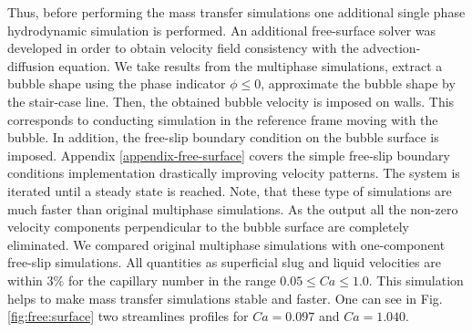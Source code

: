 \documentclass{article}
\begin{document}
\begin{description}
Thus, before performing the mass transfer simulations one additional single phase hydrodynamic
simulation is performed. An additional free-surface solver was developed in order to obtain velocity field
consistency with the advection-diffusion equation. We take results from the
multiphase simulations, extract a
bubble shape using the phase indicator $\phi\leq0$, approximate the bubble shape by the stair-case
line. Then, the obtained bubble velocity is imposed on walls. This corresponds to conducting
simulation in the reference frame moving with the bubble. In addition, the free-slip boundary
condition on the bubble surface is imposed. Appendix \ref{appendix-free-surface} covers the simple
free-slip boundary conditions implementation drastically improving velocity patterns. The system is
iterated until a
steady state is reached. Note, that these type of simulations are much faster than original
multiphase simulations. As the output all the non-zero velocity components perpendicular to the
bubble surface are completely eliminated. We compared original multiphase simulations with
one-component free-slip simulations. All quantities as superficial slug and liquid velocities are
within $3\%$ for the capillary number in the range $0.05\leq Ca \leq 1.0$. This simulation helps to
make mass transfer simulations stable and faster.%
One
can see in Fig. \ref{fig:free:surface} two streamlines profiles for $Ca=0.097$  and $Ca=1.040$.
\begin{figure}[htb!]

\end{figure}
\end{description}
\end{document}
